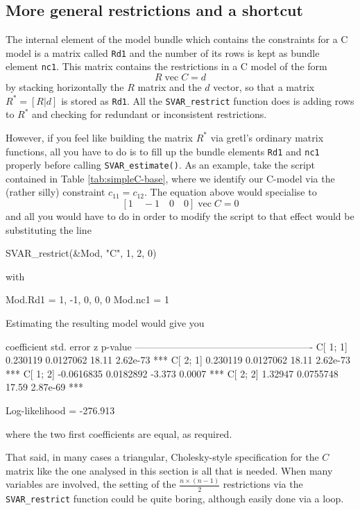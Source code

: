 \documentclass[a4paper,10pt]{article}
\newcommand{\app}[1]{\textsf{#1}}
\newcounter{script}[section]
\DeclareMathOperator{\VEC}{\mathrm{vec}}
\begin{document}
\subsection{More general restrictions and a shortcut}
\label{sec:OtherConstraints}

The internal element of the model bundle which contains the
constraints for a C model is a matrix called \texttt{Rd1} and the
number of its rows is kept as bundle element \texttt{nc1}. This matrix
contains the restrictions in a C model of the form
\[
  R \VEC C = d
\]
by stacking horizontally the $R$ matrix and the $d$ vector, so that a
matrix $R^* = [R | d ]$ is stored as \texttt{Rd1}. All the
\texttt{SVAR\_restrict} function does is adding rows to $R^*$ and
checking for redundant or inconsistent restrictions.

However, if you feel like building the matrix $R^*$ via \app{gretl}'s
ordinary matrix functions, all you have to do is to fill up the bundle
elements \texttt{Rd1} and \texttt{nc1} properly before calling
\texttt{SVAR\_estimate()}. As an example, take the script contained in
Table \ref{tab:simpleC-base}, where we identify our C-model via the
(rather silly) constraint $c_{11} = c_{12}$. The equation above would
specialise to
\[
  [1 \quad -1 \quad 0 \quad 0 ] \VEC C = 0
\]
and all you would have to do in order to modify the script to that
effect would be substituting the line
\begin{code}
SVAR_restrict(&Mod, "C", 1, 2, 0)
\end{code}
with
\begin{code}
Mod.Rd1 = {1, -1, 0, 0, 0}
Mod.nc1 = 1
\end{code}
Estimating the resulting model would give you
\begin{code}

             coefficient   std. error     z      p-value 
  -------------------------------------------------------
  C[ 1; 1]    0.230119     0.0127062    18.11    2.62e-73 ***
  C[ 2; 1]    0.230119     0.0127062    18.11    2.62e-73 ***
  C[ 1; 2]   -0.0616835    0.0182892    -3.373   0.0007   ***
  C[ 2; 2]    1.32947      0.0755748    17.59    2.87e-69 ***

  Log-likelihood = -276.913
\end{code}
where the two first coefficients are equal, as required.

That said, in many cases a triangular, Cholesky-style specification
for the $C$ matrix like the one analysed in this section is all that
is needed. When many variables are involved, the setting of the
$\frac{n \times (n-1)}{2}$ restrictions via the
\texttt{SVAR\_restrict} function could be quite boring, although
easily done via a loop.
\end{document}
